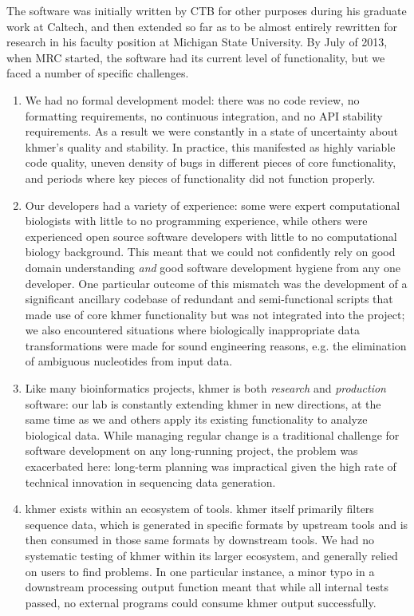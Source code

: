 \documentclass[12pt]{article}
\begin{document}
The software was initially written by CTB for other purposes during
his graduate work at Caltech, and then extended so far as to be almost
entirely rewritten for research in his faculty position at Michigan
State University.  By July of 2013, when MRC started, the software had
its current level of functionality, but we faced a number of specific
challenges.

\begin{enumerate}

\item We had no formal development model: there was no code review, no
  formatting requirements, no continuous integration, and no API
  stability requirements.  As a result we were constantly in a
  state of uncertainty about khmer's quality and stability.  In practice,
  this manifested as highly variable code quality, uneven density of
  bugs in different pieces of core functionality, and periods where
  key pieces of functionality did not function properly.

\item Our developers had a variety of experience: some were expert
  computational biologists with little to no programming experience,
  while others were experienced open source software developers with
  little to no computational biology background.  This meant that we
  could not confidently rely on good domain understanding {\em and}
  good software development hygiene from any one developer.  One
  particular outcome of this mismatch was the development of a
  significant ancillary codebase of redundant and semi-functional
  scripts that made use of core khmer functionality but was not
  integrated into the project; we also encountered situations where
  biologically inappropriate data transformations were made for sound
  engineering reasons, e.g. the elimination of ambiguous nucleotides
  from input data.

\item Like many bioinformatics projects, khmer is both {\em
  research} and {\em production} software: our lab is constantly
  extending khmer in new directions, at the same time as we and others
  apply its existing functionality to analyze biological data.
  While managing regular change is a traditional challenge
  for software development on any long-running project, the problem was
  exacerbated here: long-term planning was impractical given
  the high rate of technical innovation in sequencing data generation.

\item khmer exists within an ecosystem of tools. khmer itself
  primarily filters sequence data, which is generated in specific
  formats by upstream tools and is then consumed in those same formats
  by downstream tools.  We had no systematic testing of khmer within
  its larger ecosystem, and generally relied on users to find
  problems.  In one particular instance, a minor typo in a downstream
  processing output function meant that while all internal tests
  passed, no external programs could consume khmer output
  successfully.

\end{enumerate}
\end{document}
